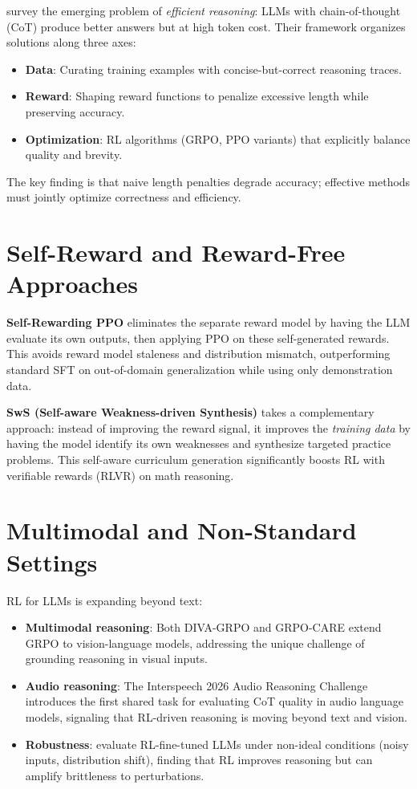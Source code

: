 \documentclass[11pt]{article}
\begin{document}
\citet{wu2026efficient} survey the emerging problem of \emph{efficient reasoning}: LLMs with chain-of-thought (CoT) produce better answers but at high token cost. Their framework organizes solutions along three axes:
\begin{itemize}
    \item \textbf{Data}: Curating training examples with concise-but-correct reasoning traces.
    \item \textbf{Reward}: Shaping reward functions to penalize excessive length while preserving accuracy.
    \item \textbf{Optimization}: RL algorithms (GRPO, PPO variants) that explicitly balance quality and brevity.
\end{itemize}
The key finding is that naive length penalties degrade accuracy; effective methods must jointly optimize correctness and efficiency.

\section{Self-Reward and Reward-Free Approaches}

\textbf{Self-Rewarding PPO} \citep{zhang2025selfrewarding} eliminates the separate reward model by having the LLM evaluate its own outputs, then applying PPO on these self-generated rewards. This avoids reward model staleness and distribution mismatch, outperforming standard SFT on out-of-domain generalization while using only demonstration data.

\textbf{SwS (Self-aware Weakness-driven Synthesis)} \citep{liang2025sws} takes a complementary approach: instead of improving the reward signal, it improves the \emph{training data} by having the model identify its own weaknesses and synthesize targeted practice problems. This self-aware curriculum generation significantly boosts RL with verifiable rewards (RLVR) on math reasoning.

\section{Multimodal and Non-Standard Settings}

RL for LLMs is expanding beyond text:
\begin{itemize}
    \item \textbf{Multimodal reasoning}: Both DIVA-GRPO and GRPO-CARE \citep{chen2025care} extend GRPO to vision-language models, addressing the unique challenge of grounding reasoning in visual inputs.
    \item \textbf{Audio reasoning}: The Interspeech 2026 Audio Reasoning Challenge \citep{ma2026interspeech} introduces the first shared task for evaluating CoT quality in audio language models, signaling that RL-driven reasoning is moving beyond text and vision.
    \item \textbf{Robustness}: \citet{tian2025robustness} evaluate RL-fine-tuned LLMs under non-ideal conditions (noisy inputs, distribution shift), finding that RL improves reasoning but can amplify brittleness to perturbations.
\end{itemize}
\end{document}
